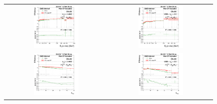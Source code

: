 \begin{figure}[bh]
  \begin{center}
    \begin{tabular}{cc}
      \includegraphics[width=0.45\textwidth]{figures/Zprime/2016/ScaleFactor/SameSign/N_1_eff/g_compare_cut_Et_Barrel_ea_ta_inc_AS_N_3_Trk_PUW.png} &
      \includegraphics[width=0.45\textwidth]{figures/Zprime/2016/ScaleFactor/SameSign/N_1_eff/g_compare_cut_Et_Endcap_ea_ta_inc_AS_N_3_Trk_PUW.png} \\
      \includegraphics[width=0.45\textwidth]{figures/Zprime/2016/ScaleFactor/SameSign/N_1_eff/g_compare_cut_nVtx_Barrel_ea_ta_inc_AS_N_3_Trk_PUW.png} &
      \includegraphics[width=0.45\textwidth]{figures/Zprime/2016/ScaleFactor/SameSign/N_1_eff/g_compare_cut_nVtx_Endcap_ea_ta_inc_AS_N_3_Trk_PUW.png} \\

\end{tabular}
\end{center}
\end{figure}
